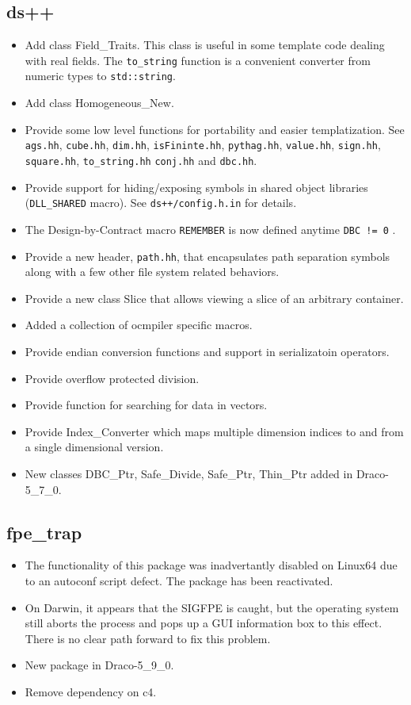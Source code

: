 \documentclass[note]{ResearchNote}
\newcommand{\draco}{Draco}
\begin{document}
\subsection{ds++}
\label{changes:dsxx}
\begin{itemize}
\item Add class \textsf{Field\_Traits}. This class is useful in some
  template code dealing with real fields.  The \texttt{to\_string}
  function is a convenient converter from numeric types to
  \texttt{std::string}.
\item Add class \textsf{Homogeneous\_New}.
\item Provide some low level functions for portability and easier
  templatization.  See \texttt{ags.hh}, \texttt{cube.hh},
  \texttt{dim.hh}, \texttt{isFininte.hh}, \texttt{pythag.hh},
  \texttt{value.hh}, \texttt{sign.hh}, \texttt{square.hh},
  \texttt{to\_string.hh} \texttt{conj.hh} and \texttt{dbc.hh}.
\item Provide support for hiding/exposing symbols in shared object
  libraries (\texttt{DLL\_SHARED} macro).  See
  \texttt{ds++/config.h.in} for details.
\item The Design-by-Contract macro \texttt{REMEMBER} is now defined
  anytime \texttt{DBC != 0} .
\item Provide a new header, \texttt{path.hh}, that encapsulates path
  separation symbols along with a few other file system related
  behaviors.
\item Provide a new class \textsf{Slice} that allows viewing a slice
  of an arbitrary container.
\item Added a collection of ocmpiler specific macros.
\item Provide endian conversion functions and support in serializatoin
  operators.
\item Provide overflow protected division.
\item Provide function for searching for data in vectors.
\item Provide \textsf{Index\_Converter} which maps multiple dimension
  indices to and from a single dimensional version.
\item New classes \textsf{DBC\_Ptr}, \textsf{Safe\_Divide},
  \textsf{Safe\_Ptr}, \textsf{Thin\_Ptr} added in \draco-5\_7\_0.
\end{itemize}

\subsection{fpe\_trap}
\label{change:fpe-trap}
\begin{itemize}
\item The functionality of this package was inadvertantly disabled on
  Linux64 due to an autoconf script defect.  The package has been
  reactivated.
\item On Darwin, it appears that the SIGFPE is caught, but the
  operating system still aborts the process and pops up a GUI
  information box to this effect.  There is no clear path forward to
  fix this problem.
\item New package in \draco-5\_9\_0.
\item Remove dependency on \textsf{c4}.
\end{itemize}
\end{document}

